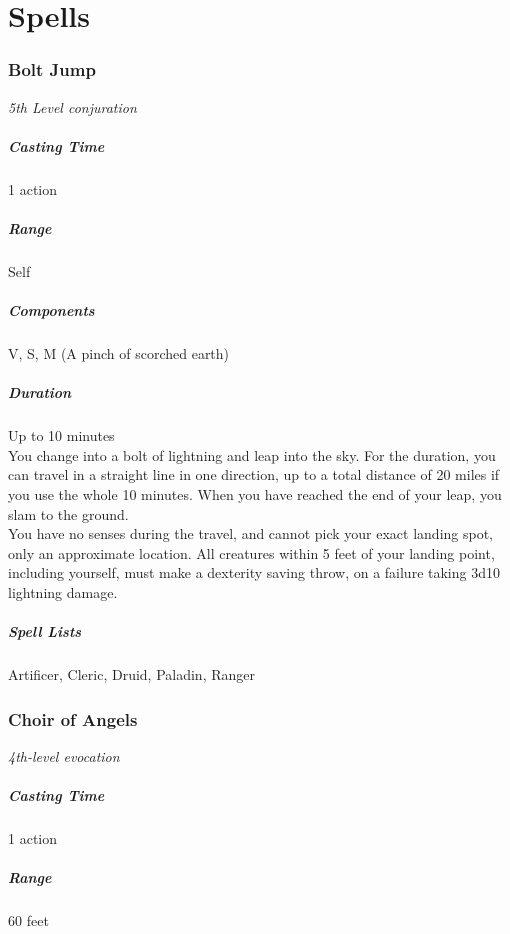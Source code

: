 \chapter{Spells}\label{Spells}

\subsection{Bolt Jump}
\textit{5th Level conjuration}
\hfill \break
\paragraph{Casting Time} 1 action
\paragraph{Range} Self
\paragraph{Components} V, S, M (A pinch of scorched earth)
\paragraph{Duration} Up to 10 minutes\\
\hfill \break
You change into a bolt of lightning and leap into the sky. For the duration, you can travel in a straight line in one direction, up to a total distance of 20 miles if you use the whole 10 minutes. When you have reached the end of your leap, you slam to the ground. \\
You have no senses during the travel, and cannot pick your exact landing spot, only an approximate location. All creatures within 5 feet of your landing point, including yourself, must make a dexterity saving throw, on a failure taking 3d10 lightning damage.
\hfill \break
\paragraph{Spell Lists} Artificer, Cleric, Druid, Paladin, Ranger

\subsection{Choir of Angels}
\textit{4th-level evocation}
\hfill \break
\paragraph{Casting Time} 1 action
\paragraph{Range} 60 feet
